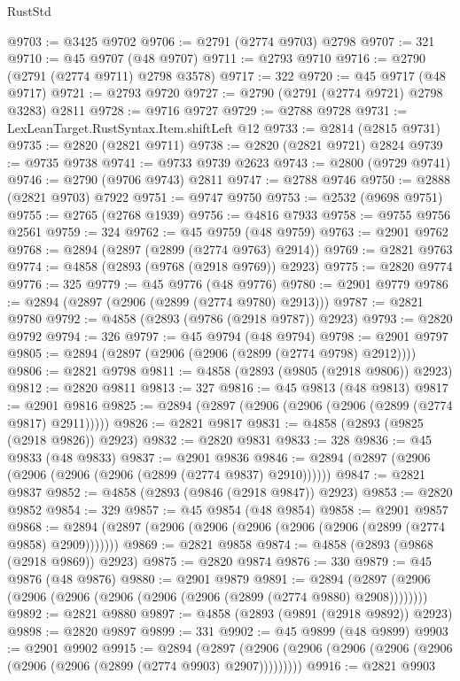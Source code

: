 \begin{lexlean}{RustStd}
\begin{coremodule}
@9703 := @3425 @9702
@9706 := @2791 (@2774 @9703) @2798
@9707 := 321
@9710 := @45 @9707 (@48 @9707)
@9711 := @2793 @9710
@9716 := @2790 (@2791 (@2774 @9711) @2798 @3578)
@9717 := 322
@9720 := @45 @9717 (@48 @9717)
@9721 := @2793 @9720
@9727 := @2790 (@2791 (@2774 @9721) @2798 @3283) @2811
@9728 := @9716 @9727
@9729 := @2788 @9728
@9731 := LexLeanTarget.RustSyntax.Item.shiftLeft @12
@9733 := @2814 (@2815 @9731)
@9735 := @2820 (@2821 @9711)
@9738 := @2820 (@2821 @9721) @2824
@9739 := @9735 @9738
@9741 := @9733 @9739 @2623
@9743 := @2800 (@9729 @9741)
@9746 := @2790 (@9706 @9743) @2811
@9747 := @2788 @9746
@9750 := @2888 (@2821 @9703) @7922
@9751 := @9747 @9750
@9753 := @2532 (@9698 @9751)
@9755 := @2765 (@2768 @1939)
@9756 := @4816 @7933
@9758 := @9755 @9756 @2561
@9759 := 324
@9762 := @45 @9759 (@48 @9759)
@9763 := @2901 @9762
@9768 := @2894 (@2897 (@2899 (@2774 @9763) @2914))
@9769 := @2821 @9763
@9774 := @4858 (@2893 (@9768 (@2918 @9769)) @2923)
@9775 := @2820 @9774
@9776 := 325
@9779 := @45 @9776 (@48 @9776)
@9780 := @2901 @9779
@9786 := @2894 (@2897 (@2906 (@2899 (@2774 @9780) @2913)))
@9787 := @2821 @9780
@9792 := @4858 (@2893 (@9786 (@2918 @9787)) @2923)
@9793 := @2820 @9792
@9794 := 326
@9797 := @45 @9794 (@48 @9794)
@9798 := @2901 @9797
@9805 := @2894 (@2897 (@2906 (@2906 (@2899 (@2774 @9798) @2912))))
@9806 := @2821 @9798
@9811 := @4858 (@2893 (@9805 (@2918 @9806)) @2923)
@9812 := @2820 @9811
@9813 := 327
@9816 := @45 @9813 (@48 @9813)
@9817 := @2901 @9816
@9825 := @2894 (@2897 (@2906 (@2906 (@2906 (@2899 (@2774 @9817) @2911)))))
@9826 := @2821 @9817
@9831 := @4858 (@2893 (@9825 (@2918 @9826)) @2923)
@9832 := @2820 @9831
@9833 := 328
@9836 := @45 @9833 (@48 @9833)
@9837 := @2901 @9836
@9846 := @2894 (@2897 (@2906 (@2906 (@2906 (@2906 (@2899 (@2774 @9837) @2910))))))
@9847 := @2821 @9837
@9852 := @4858 (@2893 (@9846 (@2918 @9847)) @2923)
@9853 := @2820 @9852
@9854 := 329
@9857 := @45 @9854 (@48 @9854)
@9858 := @2901 @9857
@9868 := @2894 (@2897 (@2906 (@2906 (@2906 (@2906 (@2906 (@2899 (@2774 @9858) @2909)))))))
@9869 := @2821 @9858
@9874 := @4858 (@2893 (@9868 (@2918 @9869)) @2923)
@9875 := @2820 @9874
@9876 := 330
@9879 := @45 @9876 (@48 @9876)
@9880 := @2901 @9879
@9891 := @2894 (@2897 (@2906 (@2906 (@2906 (@2906 (@2906 (@2906 (@2899 (@2774 @9880) @2908))))))))
@9892 := @2821 @9880
@9897 := @4858 (@2893 (@9891 (@2918 @9892)) @2923)
@9898 := @2820 @9897
@9899 := 331
@9902 := @45 @9899 (@48 @9899)
@9903 := @2901 @9902
@9915 := @2894
    (@2897 (@2906 (@2906 (@2906 (@2906 (@2906 (@2906 (@2906 (@2899 (@2774 @9903) @2907)))))))))
@9916 := @2821 @9903

\end{coremodule}
\end{lexlean}
